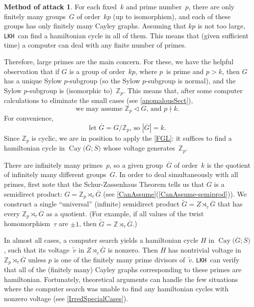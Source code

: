 \documentclass[]{amcjoucc}
\newcommand{\csee}[1]{\textup(see \cref{#1}\textup)}
\newcommand{\fullcsee}[2]{\textup(see \fullcref{#1}{#2}\textup)}
\newcommand{\pref}[1]{(\ref{#1})}
\newcommand{\fullcref}[2]{\cref{#1}\pref{#1-#2}}
\theoremstyle{plain}
\theoremstyle{definition}
\newtheorem{attack}[equation]{Method of attack}
\theoremstyle{definition}
\DeclareMathOperator{\Cay}{Cay}
\newcommand{\quot}{\overline}
\newcommand{\LKH}{\filename{LKH}}
\newcommand{\ZZ}{\mathbb{Z}}
\newcommand{\normal}{\triangleleft}
\newcommand{\filename}[1]{\texttt{#1}}
\begin{document}
\begin{attack}
For each fixed~$k$ and prime number~$p$, there are only finitely many groups~$G$ of order~$kp$ (up to isomorphism), and each of these groups has only finitely many Cayley graphs. Assuming that $kp$ is not too large, \LKH\ can find a hamiltonian cycle in all of them. This means that (given sufficient time) a computer can deal with any finite number of primes. 

Therefore, large primes are the main concern. For these, we have the helpful observation that if $G$ is a group of order~$kp$, where $p$~is prime and $p > k$, then $G$ has a unique Sylow $p$-subgroup (so the Sylow $p$-subgroup is normal), and the Sylow $p$-subgroup is \textup(isomorphic to\textup)~$\ZZ_p$. This means that, after some computer calculations to eliminate the small cases \csee{anomalousSect}, 
	$$ \text{we may assume $\ZZ_p \normal G$, and $p \nmid k$}. $$
 For convenience, 
 	$$ \text{let $\quot G = G/\ZZ_p$, so $|\quot G| = k$.} $$
Since $\ZZ_p$ is cyclic, we are in position to apply the \cref{FGL}: it suffices to find a hamiltonian cycle in $\Cay\bigl( \quot G; \quot S \bigr)$ whose voltage generates~$\ZZ_p$.

There are infinitely many primes~$p$, so a given group~$\quot G$ of order~$k$ is the quotient of infinitely many different groups~$G$. In order to deal simultaneously with all primes, first note that the Schur-Zassenhaus Theorem \cite{Wikipedia-SchurZassenhaus} tells us that $G$ is a semidirect product: $G = \ZZ_p \rtimes_\tau \quot G$ \fullcsee{CanAssume}{semiprod}. We construct a single ``universal'' (infinite) semidirect product $\widetilde G = Z \rtimes_{\widetilde\tau} \quot G$ that has every $\ZZ_p \rtimes_\tau \quot G$ as a quotient. (For example, if all values of the twist homomorphism~$\tau$ are $\pm1$, then $\widetilde G = \ZZ \rtimes_\tau \quot G$.) 

In almost all cases, a computer search yields a hamiltonian cycle $H$ in $\Cay\bigl( \quot G; \quot S \bigr)$, such that its voltage~$\widetilde v$ in $Z \rtimes_{\widetilde\tau} \quot G$ is nonzero. Then $H$ has nontrivial voltage in $\ZZ_p \rtimes_\tau \quot G$ unless $p$ is one of the finitely many prime divisors of~$\widetilde v$.  \LKH\ can verify that all of the (finitely many) Cayley graphs corresponding to these primes are hamiltonian. 
Fortunately, theoretical arguments can handle the few situations where the computer search was unable to find any hamiltonian cycles with nonzero voltage \csee{IrredSpecialCases}.
\end{attack}
\end{document}
